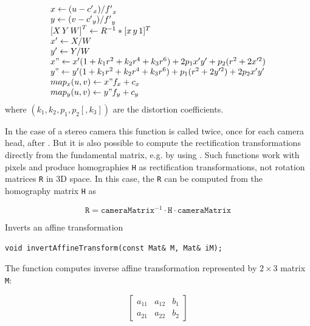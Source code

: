 \[
\begin{array}{l}
x \leftarrow (u - {c'}_x)/{f'}_x \\
y \leftarrow (v - {c'}_y)/{f'}_y \\
{[X\,Y\,W]}^T \leftarrow R^{-1}*[x\,y\,1]^T \\
x' \leftarrow X/W \\
y' \leftarrow Y/W \\
x" \leftarrow x' (1 + k_1 r^2 + k_2 r^4 + k_3 r^6) + 2p_1 x' y' + p_2(r^2 + 2 x'^2) \\
y" \leftarrow y' (1 + k_1 r^2 + k_2 r^4 + k_3 r^6) + p_1 (r^2 + 2 y'^2) + 2 p_2 x' y' \\
map_x(u,v) \leftarrow x" f_x + c_x \\
map_y(u,v) \leftarrow y" f_y + c_y
\end{array}
\]
where $(k_1, k_2, p_1, p_2[, k_3])$\label{4x1, 1x4, 5x1 or 1x5} are the distortion coefficients. 
 
In the case of a stereo camera this function is called twice, once for each camera head, after . But it is also possible to compute the rectification transformations directly from the fundamental matrix, e.g. by using . Such functions work with pixels and produce homographies \texttt{H} as rectification transformations, not rotation matrices \texttt{R} in 3D space. In this case, the \texttt{R} can be computed from the homography matrix \texttt{H} as 

\[ \texttt{R} = \texttt{cameraMatrix}^{-1} \cdot \texttt{H} \cdot \texttt{cameraMatrix} \]

\label{invertAffineTransform}
Inverts an affine transformation

\begin{lstlisting}
void invertAffineTransform(const Mat& M, Mat& iM);
\end{lstlisting}
\begin{description}
\end{description}

The function computes inverse affine transformation represented by $2 \times 3$ matrix \texttt{M}:

\[\begin{bmatrix}
a_{11} & a_{12} & b_1 \\
a_{21} & a_{22} & b_2
\end{bmatrix}
\]

